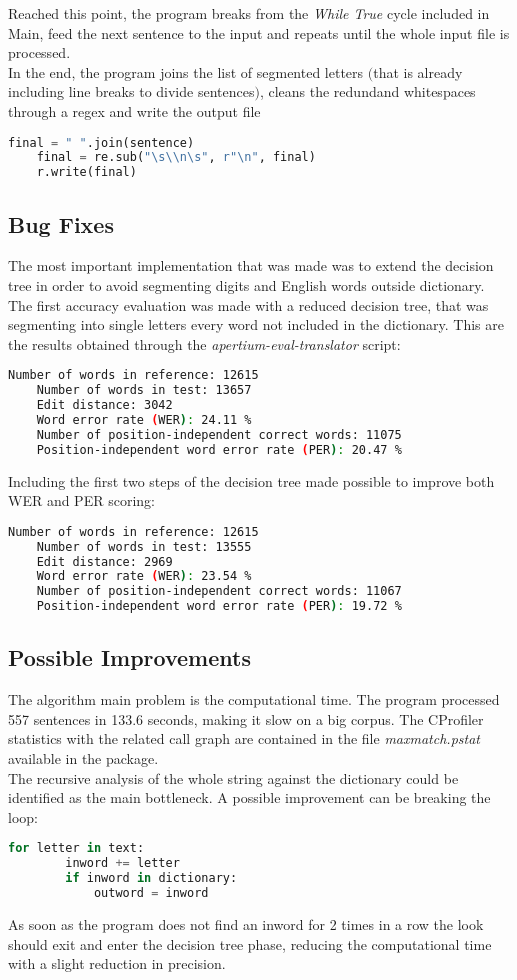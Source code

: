 \documentclass{hitec}
\begin{document}
	Reached this point, the program breaks from the \textit{While True} cycle included in Main, feed the next sentence to the input and repeats until the whole input file is processed. \\
	In the end, the program joins the list of segmented letters $($that is already including line breaks to divide sentences$)$, cleans the redundand whitespaces through a regex and write the output file
	\begin{lstlisting}[language=python]
	final = " ".join(sentence)
	final = re.sub("\s\\n\s", r"\n", final)
	r.write(final)
	\end{lstlisting}
	\subsection{Bug Fixes}
	The most important implementation that was made was to extend the decision tree in order to avoid segmenting digits and English words outside dictionary. \\
	The first accuracy evaluation was made with a reduced decision tree, that was segmenting into single letters every word not included in the dictionary. This are the results obtained through the \textit{apertium-eval-translator} script:
	\begin{lstlisting}[language=bash]
	Number of words in reference: 12615
	Number of words in test: 13657
	Edit distance: 3042
	Word error rate (WER): 24.11 %
	Number of position-independent correct words: 11075
	Position-independent word error rate (PER): 20.47 %
	\end{lstlisting}
	Including the first two steps of the decision tree made possible to improve both WER and PER scoring:
	\begin{lstlisting}[language=bash]
	Number of words in reference: 12615
	Number of words in test: 13555
	Edit distance: 2969
	Word error rate (WER): 23.54 %
	Number of position-independent correct words: 11067
	Position-independent word error rate (PER): 19.72 %
	\end{lstlisting}
	\subsection{Possible Improvements}
	The algorithm main problem is the computational time. The program processed 557 sentences in 133.6 seconds, making it slow on a big corpus. The CProfiler statistics with the related call graph are contained in the file \textit{maxmatch.pstat} available in the package. \\ 
	The recursive analysis of the whole string against the dictionary could be identified as the main bottleneck. A possible improvement can be breaking the loop:
	\begin{lstlisting}[language=python]
	for letter in text:
		inword += letter
		if inword in dictionary:
			outword = inword
	\end{lstlisting}
	As soon as the program does not find an inword for 2 times in a row the look should exit and enter the decision tree phase, reducing the computational time with a slight reduction in precision.
\end{document}
